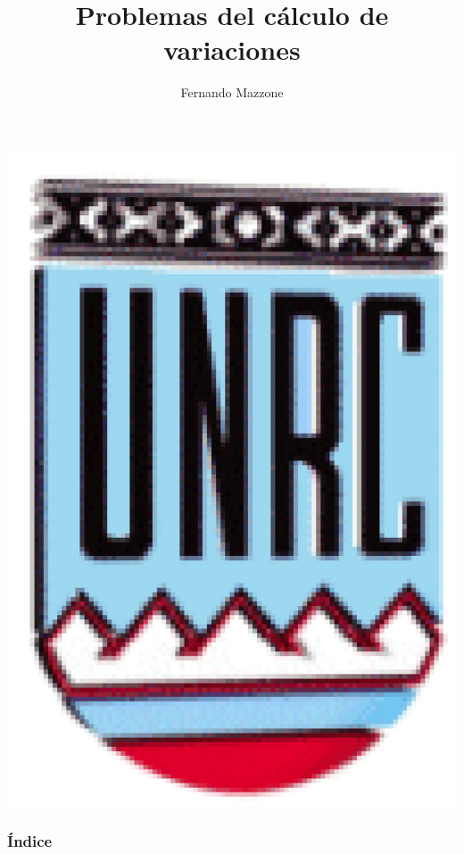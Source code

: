 \documentclass[handout,hyperref={colorlinks=true}]{beamer}
\title[Cálculo de variaciones] %
{%
Problemas del cálculo de variaciones
}
\author[] %
{Fernando Mazzone}
\institute[Depto de Matemática] %
{
 Dpto de Matemática\\
Facultad de Ciencias Exactas Físico-Químicas y Naturales\\
Universidad Nacional de Río Cuarto
 Dpto de Matemática\\
Facultad de Ciencias Exactas y Naturales\\
Universidad Nacional de La Pampa\\
CONICET}
\begin{document}
\begin{frame}
  \maketitle
  \begin{center}
   \includegraphics[scale=0.2]{imagenes/unrc.jpg}
   \end{center}
\end{frame}
\begin{frame}
    \frametitle{Índice}
\tableofcontents

\end{frame}
\end{document}
